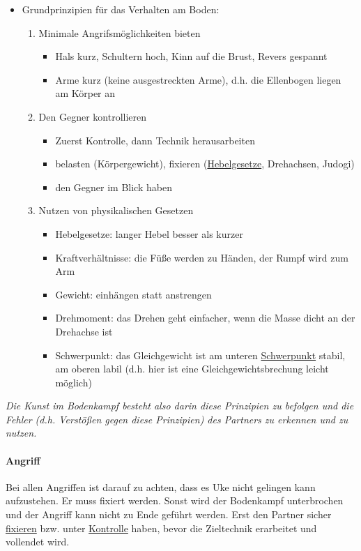 \documentclass[justified, a4paper, notitlepage, captions=tableheading, nobib]{tufte-handout}
\begin{document}
\begin{itemize}
\item Grundprinzipien für das Verhalten am Boden:
\begin{enumerate}
\item Minimale Angrifsmöglichkeiten bieten
\begin{itemize}
\item Hals kurz, Schultern hoch, Kinn auf die Brust, Revers gespannt
\item Arme kurz (keine ausgestreckten Arme), d.h. die Ellenbogen liegen am Körper an
\end{itemize}
\item Den Gegner kontrollieren
\begin{itemize}
\item Zuerst \label{org15bbf8e}Kontrolle, dann Technik herausarbeiten
\item \label{orgf07e005}belasten (Körpergewicht), \label{org62822f6}fixieren (\hyperref[org6c6f271]{Hebelgesetze}, Drehachsen, Judogi)
\item den Gegner im Blick haben
\end{itemize}
\item Nutzen von physikalischen Gesetzen
\begin{itemize}
\item \label{org6c6f271}Hebelgesetze: langer Hebel besser als kurzer
\item \label{org19c3698}Kraftverhältnisse: die Füße werden zu Händen, der Rumpf wird zum Arm
\item \label{org889513a}Gewicht: einhängen statt anstrengen
\item \label{org1d7d4fc}Drehmoment: das Drehen geht einfacher, wenn die Masse dicht an der Drehachse ist
\item \label{org8fdad0e}Schwerpunkt: das Gleichgewicht ist am unteren \hyperref[org8fdad0e]{Schwerpunkt} stabil, am oberen labil (d.h. hier ist eine \label{orgc1d00b8}Gleichgewichtsbrechung leicht möglich)
\end{itemize}
\end{enumerate}
\end{itemize}

\emph{Die Kunst im Bodenkampf besteht also darin diese Prinzipien zu befolgen und die Fehler (d.h. Verstößen gegen diese Prinzipien) des Partners zu erkennen und zu nutzen.}

\paragraph{Angriff}
\label{sec:org78a132d}
Bei allen Angriffen ist darauf zu achten, dass es Uke nicht gelingen kann aufzustehen. 
Er muss fixiert werden. Sonst wird der Bodenkampf unterbrochen und der Angriff kann nicht zu Ende geführt werden.
Erst den Partner sicher \hyperref[org62822f6]{fixieren} bzw. unter \hyperref[org15bbf8e]{Kontrolle} haben, bevor die Zieltechnik erarbeitet und vollendet wird.
\end{document}
